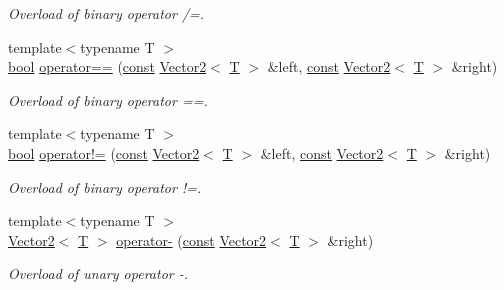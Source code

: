 \begin{DoxyCompactItemize}
\begin{DoxyCompactList}\small\item\em Overload of binary operator /=. \end{DoxyCompactList}\item 
{\footnotesize template$<$typename T $>$ }\\\hyperlink{term__entry_8h_a002004ba5d663f149f6c38064926abac}{bool} \hyperlink{classsf_1_1_vector2_a9a7b2d36c3850828fdb651facfd25136}{operator==} (\hyperlink{term__entry_8h_a57bd63ce7f9a353488880e3de6692d5a}{const} \hyperlink{classsf_1_1_vector2}{Vector2}$<$ \hyperlink{curses_8priv_8h_a5ef253115820acf7d27f3c5c3b02a0f0}{T} $>$ \&left, \hyperlink{term__entry_8h_a57bd63ce7f9a353488880e3de6692d5a}{const} \hyperlink{classsf_1_1_vector2}{Vector2}$<$ \hyperlink{curses_8priv_8h_a5ef253115820acf7d27f3c5c3b02a0f0}{T} $>$ \&right)
\begin{DoxyCompactList}\small\item\em Overload of binary operator ==. \end{DoxyCompactList}\item 
{\footnotesize template$<$typename T $>$ }\\\hyperlink{term__entry_8h_a002004ba5d663f149f6c38064926abac}{bool} \hyperlink{classsf_1_1_vector2_a01673da35ef9c52d0e54b8263549a956}{operator!=} (\hyperlink{term__entry_8h_a57bd63ce7f9a353488880e3de6692d5a}{const} \hyperlink{classsf_1_1_vector2}{Vector2}$<$ \hyperlink{curses_8priv_8h_a5ef253115820acf7d27f3c5c3b02a0f0}{T} $>$ \&left, \hyperlink{term__entry_8h_a57bd63ce7f9a353488880e3de6692d5a}{const} \hyperlink{classsf_1_1_vector2}{Vector2}$<$ \hyperlink{curses_8priv_8h_a5ef253115820acf7d27f3c5c3b02a0f0}{T} $>$ \&right)
\begin{DoxyCompactList}\small\item\em Overload of binary operator !=. \end{DoxyCompactList}\item 
{\footnotesize template$<$typename T $>$ }\\\hyperlink{classsf_1_1_vector2}{Vector2}$<$ \hyperlink{curses_8priv_8h_a5ef253115820acf7d27f3c5c3b02a0f0}{T} $>$ \hyperlink{classsf_1_1_vector2_a3885c2e66dc427cec7eaa178d59d8e8b}{operator-\/} (\hyperlink{term__entry_8h_a57bd63ce7f9a353488880e3de6692d5a}{const} \hyperlink{classsf_1_1_vector2}{Vector2}$<$ \hyperlink{curses_8priv_8h_a5ef253115820acf7d27f3c5c3b02a0f0}{T} $>$ \&right)
\begin{DoxyCompactList}\small\item\em Overload of unary operator -\/. \end{DoxyCompactList}\item 

\end{DoxyCompactItemize}
